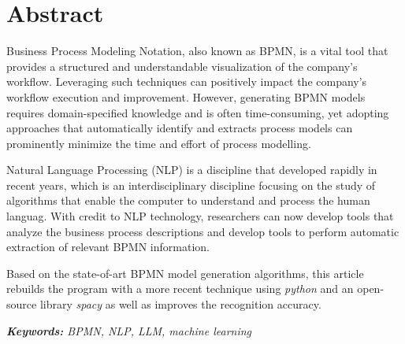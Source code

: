 \chapter*{Abstract}
\noindent
Business Process Modeling Notation, also known as BPMN, is a vital tool that provides a structured and understandable visualization of the company's workflow. Leveraging such techniques can positively impact the company's workflow execution and improvement. However, generating BPMN models requires domain-specified knowledge and is often time-consuming, yet adopting approaches that automatically identify and extracts process models can prominently minimize the time and effort of process modelling.

Natural Language Processing (NLP) is a discipline that developed rapidly in recent years, which is an interdisciplinary discipline focusing on the study of algorithms that enable the computer to understand and process the human languag. With credit to NLP technology, researchers can now develop tools that analyze the business process descriptions and develop tools to perform automatic extraction of relevant BPMN information.

Based on the state-of-art BPMN model generation algorithms, this article rebuilds the program with a more recent technique using \textit{python} and an open-source library \textit{spacy} as well as improves the recognition accuracy.



\textit{\textbf{Keywords: }BPMN, NLP, LLM, machine learning}
